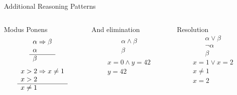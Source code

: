 \documentclass[14pt]{beamer}
\begin{document}
\begin{frame}{Additional Reasoning Patterns}
\begin{columns}[T]
\begin{column}{0.31\textwidth}
\begin{block}{Modus Ponens}
\[
\begin{array}{l}
\alpha \Rightarrow \beta \\
\alpha \\
\hline
\beta
\end{array}
\]
\bigskip
\[
\begin{array}{l}
x > 2 \Rightarrow x \neq 1 \\
x > 2 \\
\hline
x \neq 1
\end{array}
\]
\end{block}
\end{column}
\pause
\begin{column}{0.31\textwidth}
\begin{block}{And elimination}
\[
\begin{array}{l}
\\
\alpha \land \beta \\
\hline
\beta
\end{array}
\]
\bigskip
\[
\begin{array}{l}
\\
x = 0 \land y = 42 \\
\hline
y = 42
\end{array}
\]
\end{block}
\end{column}
\pause
\begin{column}{0.31\textwidth}
\begin{block}{Resolution}
\[
\begin{array}{l}
\alpha \lor \beta \\
\lnot\alpha \\
\hline
\beta
\end{array}
\]
\bigskip
\[
\begin{array}{l}
x = 1 \lor x = 2 \\
x \neq 1 \\
\hline
x = 2
\end{array}
\]
\end{block}
\end{column}
\end{columns}
\end{frame}
\end{document}
